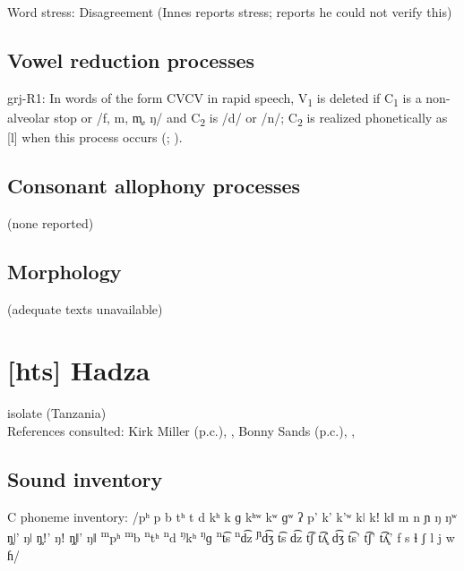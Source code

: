 {\begin{appendixdesc}
\item[Word stress:] Disagreement (Innes reports stress; \citealt{Newman1986} reports he could not verify this)
\end{appendixdesc}
\subsection*{Vowel reduction processes}
\begin{appendixdesc}

\item[grj-R1:] In words of the form CVCV in rapid speech, V\textsubscript{1} is deleted if C\textsubscript{1} is a non-alveolar stop or /f, m, m̥, ŋ/ and C\textsubscript{2} is /d/ or /n/; C\textsubscript{2} is realized phonetically as [l] when this process occurs (\citealt[130]{Innes1981}; \citeyear[15--16]{Innes1966}).
\end{appendixdesc}
\subsection*{Consonant allophony processes}
(none reported)

\subsection*{Morphology}

(adequate texts unavailable)
\section*{[hts] Hadza}   %
isolate (Tanzania)\medskip\\
References consulted: Kirk Miller (p.c.), \citet{Sands2013}, Bonny Sands (p.c.), \citet{SandsEtAl1996}, \citet{TuckerWoodburn1977}

\subsection*{Sound inventory}
\begin{appendixdesc}

\item[C phoneme inventory:] /pʰ p b tʰ t d kʰ k ɡ kʰʷ kʷ ɡʷ ʔ p’ k’ k’ʷ kǀ kǃ kǁ m n ɲ ŋ ŋʷ ŋ̥ǀ’ ŋǀ ŋ̥ǃ’ ŋǃ ŋ̥ǁ’ ŋǁ \textsuperscript{m}pʰ \textsuperscript{m}b \textsuperscript{n}tʰ \textsuperscript{n}d \textsuperscript{ŋ}kʰ \textsuperscript{ŋ}ɡ \textsuperscript{n}t͡s \textsuperscript{n}d͡z \textsuperscript{ɲ}d͡ʒ t͡s d͡z t͡ʃ t͡ʎ̥ d͡ʒ t͡s’ t͡ʃ’ t͡ʎ̥’ f s ɬ ʃ l j w ɦ/


\end{appendixdesc}}
